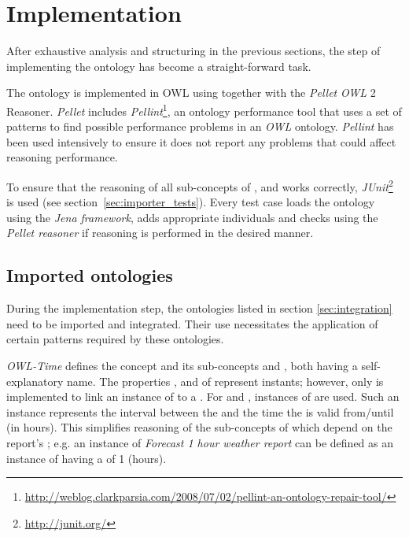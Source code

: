 \section{Implementation}
\label{sec:implementation}

After exhaustive analysis and structuring in the previous sections, the step of implementing the ontology has become a straight-forward task.

The \thinkhomeweather ontology is implemented in OWL using  together with the \emph{Pellet} \emph{OWL} 2 Reasoner. \emph{Pellet} includes \emph{Pellint}\footnote{\href{http://weblog.clarkparsia.com/2008/07/02/pellint-an-ontology-repair-tool/}{http://weblog.clarkparsia.com/2008/07/02/pellint-an-ontology-repair-tool/}}, an ontology performance tool that uses a set of patterns to find possible performance problems in an \emph{OWL} ontology. \emph{Pellint} has been used intensively to ensure it does not report any problems that could affect reasoning performance.

To ensure that the reasoning of all sub-concepts of ,  and  works correctly, \emph{JUnit}\footnote{\href{http://junit.org/}{http://junit.org/}} is used (see section~\ref{sec:importer_tests}). Every test case loads the \thinkhomeweather ontology using the \emph{Jena framework}, adds appropriate individuals and checks using the \emph{Pellet reasoner} if reasoning is performed in the desired manner.

\subsection{Imported ontologies}

During the implementation step, the ontologies listed in section \ref{sec:integration} need to be imported and integrated. Their use necessitates the application of certain patterns required by these ontologies.

\vspace{1em}

\emph{OWL-Time}\cite{owl-time} defines the concept  and its sub-concepts  and , both having a self-explanatory name. The properties ,  and  of  represent instants; however, only  is implemented to link an instance of  to a . For  and , instances of  are used. Such an instance represents the interval between the  and the time the  is valid from/until (in hours). This simplifies reasoning of the sub-concepts of  which depend on the report's ; e.g. an instance of \emph{Forecast 1 hour weather report} can be defined as an instance of  having a  of \num{1} (hours).

